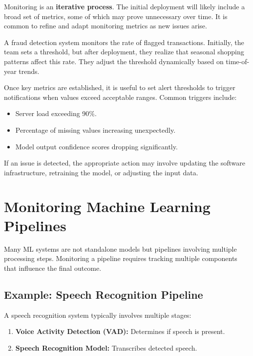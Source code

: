 \documentclass[12pt,openany, draft]{book}
\begin{document}
Monitoring is an \textbf{iterative process}. The initial deployment will likely include a broad set of metrics, some of which may prove unnecessary over time. It is common to refine and adapt monitoring metrics as new issues arise.

\begin{examplebox}
   A fraud detection system monitors the rate of flagged transactions. Initially, the team sets a threshold, but after deployment, they realize that seasonal shopping patterns affect this rate. They adjust the threshold dynamically based on time-of-year trends.
\end{examplebox}

Once key metrics are established, it is useful to set alert thresholds to trigger notifications when values exceed acceptable ranges. Common triggers include:

\begin{itemize}
    \item Server load exceeding 90\%.
    \item Percentage of missing values increasing unexpectedly.
    \item Model output confidence scores dropping significantly.
\end{itemize}

If an issue is detected, the appropriate action may involve updating the software infrastructure, retraining the model, or adjusting the input data.



\section{Monitoring Machine Learning Pipelines}

Many ML systems are not standalone models but pipelines involving multiple processing steps. Monitoring a pipeline requires tracking multiple components that influence the final outcome.


\subsection{Example: Speech Recognition Pipeline}

A speech recognition system typically involves multiple stages:

\begin{enumerate}
    \item \textbf{Voice Activity Detection (VAD):} Determines if speech is present.
    \item \textbf{Speech Recognition Model:} Transcribes detected speech.
\end{enumerate}
\end{document}
